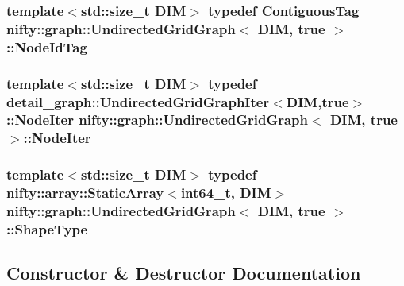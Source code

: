 \subsubsection[{Node\+Id\+Tag}]{\setlength{\rightskip}{0pt plus 5cm}template$<$std\+::size\+\_\+t D\+I\+M$>$ typedef {\bf Contiguous\+Tag} {\bf nifty\+::graph\+::\+Undirected\+Grid\+Graph}$<$ D\+I\+M, true $>$\+::{\bf Node\+Id\+Tag}}\label{classnifty_1_1graph_1_1UndirectedGridGraph_3_01DIM_00_01true_01_4_a35ae15ae07ebf58ef26916b417fba878}
\hypertarget{classnifty_1_1graph_1_1UndirectedGridGraph_3_01DIM_00_01true_01_4_a977e01bd675cc7d454ce18417c6e0397}{}
\subsubsection[{Node\+Iter}]{\setlength{\rightskip}{0pt plus 5cm}template$<$std\+::size\+\_\+t D\+I\+M$>$ typedef {\bf detail\+\_\+graph\+::\+Undirected\+Grid\+Graph\+Iter}$<$D\+I\+M,true$>$\+::{\bf Node\+Iter} {\bf nifty\+::graph\+::\+Undirected\+Grid\+Graph}$<$ D\+I\+M, true $>$\+::{\bf Node\+Iter}}\label{classnifty_1_1graph_1_1UndirectedGridGraph_3_01DIM_00_01true_01_4_a977e01bd675cc7d454ce18417c6e0397}
\hypertarget{classnifty_1_1graph_1_1UndirectedGridGraph_3_01DIM_00_01true_01_4_abea92f7d305119d361e2189b00e495ba}{}
\subsubsection[{Shape\+Type}]{\setlength{\rightskip}{0pt plus 5cm}template$<$std\+::size\+\_\+t D\+I\+M$>$ typedef {\bf nifty\+::array\+::\+Static\+Array}$<$int64\+\_\+t, D\+I\+M$>$ {\bf nifty\+::graph\+::\+Undirected\+Grid\+Graph}$<$ D\+I\+M, true $>$\+::{\bf Shape\+Type}}\label{classnifty_1_1graph_1_1UndirectedGridGraph_3_01DIM_00_01true_01_4_abea92f7d305119d361e2189b00e495ba}


\subsection{Constructor \& Destructor Documentation}
\hypertarget{classnifty_1_1graph_1_1UndirectedGridGraph_3_01DIM_00_01true_01_4_ae07e559f9d33b543c69a6466bbc10348}{}
